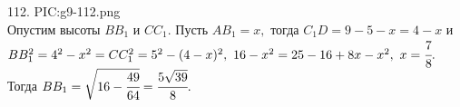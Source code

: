 112. {{PIC:g9-112.png}}\\
Опустим высоты $BB_1$ и $CC_1.$ Пусть $AB_1=x,$ тогда $C_1D=9-5-x=4-x$ и $BB_1^2=4^2-x^2=CC_1^2=5^2-(4-x)^2,\ 16-x^2=25-16+8x-x^2,\ x=\cfrac{7}{8}.$ Тогда $BB_1=\sqrt{16-\cfrac{49}{64}}=\cfrac{5\sqrt{39}}{8}.$\\
